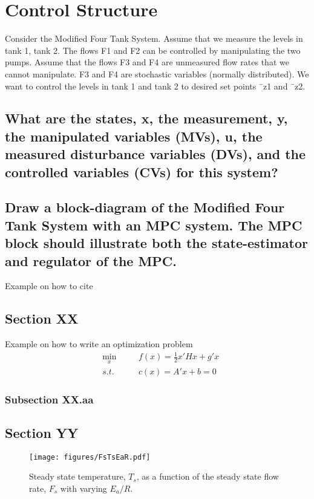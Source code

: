 \chapter{Control Structure}

Consider the Modified Four Tank System. Assume that we measure the levels in tank 1, tank 2. The flows F1 and F2 can be controlled by manipulating the two pumps. Assume that the flows F3 and F4 are unmeasured flow rates that we cannot manipulate. F3 and F4 are stochastic variables (normally distributed). We want to control the levels in tank 1 and tank 2 to desired set points ¯z1 and ¯z2.

\section{What are the states, x, the measurement, y, the manipulated variables (MVs), u, the measured disturbance variables (DVs), and the controlled variables (CVs) for this system?}

\section{Draw a block-diagram of the Modified Four Tank System with an MPC system. The MPC block should illustrate both the state-estimator and regulator of the MPC.}


\iffalse
Example on how to cite
\cite{Nocedal:Wright:2006}

\section{Section XX}
Example on how to write an optimization problem
\begin{subequations}
\begin{alignat}{3}
& \min_x \quad && f(x) = \frac{1}{2} x' H x + g' x \\
& s.t. && c(x) = A' x + b = 0
\end{alignat}
\end{subequations}

\subsection{Subsection XX.aa}

\section{Section YY}

\begin{figure}[!b]
    \centering
    \texttt{[image: figures/FsTsEaR.pdf]}
\caption{Steady state temperature, $T_s$, as a function of the steady state flow rate, $F_s$ with varying $E_a/R$.}\label{fig:FsTsEaR}
\end{figure}


